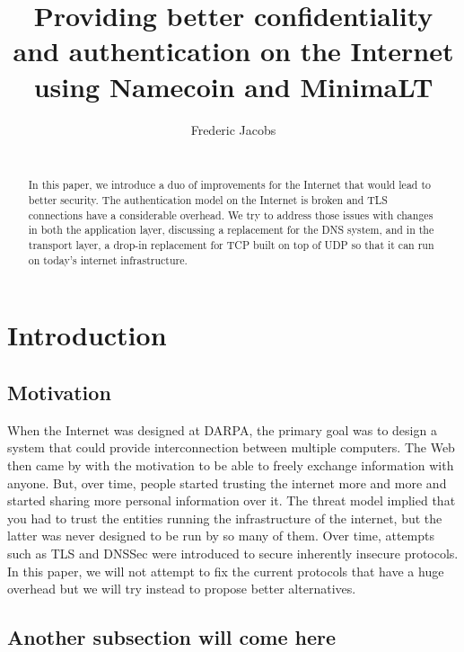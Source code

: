 \documentclass{vldb}
\begin{document}
\title{Providing better confidentiality and authentication on the Internet using Namecoin and MinimaLT}

\author{
\alignauthor
Frederic Jacobs\\
\\
}

\maketitle

\begin{abstract}
In this paper, we introduce a duo of improvements for the Internet that would lead to better security. The authentication model on the Internet is broken and TLS connections have a considerable overhead. We try to address those issues with changes in both the application layer, discussing a replacement for the DNS system, and in the transport layer, a drop-in replacement for TCP built on top of UDP so that it can run on today's internet infrastructure.

\end{abstract}

\section{Introduction}

\subsection{Motivation}

When the Internet was designed at DARPA, the primary goal was to design a system that could provide interconnection between multiple computers. The Web then came by with the motivation to be able to freely exchange information with anyone. But, over time, people started trusting the internet more and more and started sharing more personal information over it. The threat model implied that you had to trust the entities running the infrastructure of the internet, but the latter was never designed to be run by so many of them. Over time, attempts such as TLS and DNSSec were introduced to secure inherently insecure protocols. In this paper, we will not attempt to fix the current protocols that have a huge overhead but we will try instead to propose better alternatives.

\subsection{Another subsection will come here}
\end{document}
